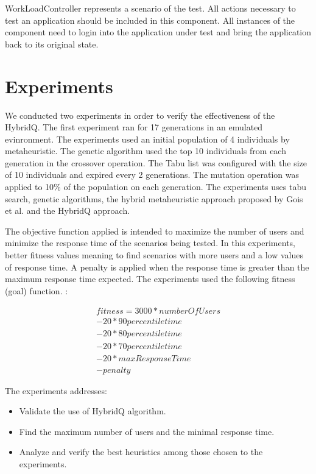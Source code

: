 WorkLoadController represents a scenario of the test. All actions necessary to test an application should be included in this component. All instances of the component need to login into the application under test and bring the application back to its original state.

\section{Experiments}

We conducted two experiments in order to verify the effectiveness of the HybridQ. The first experiment ran for 17 generations in an emulated evinronment. The experiments used an initial population of 4 individuals by metaheuristic. The genetic algorithm used the top 10 individuals from each generation in the crossover operation. The Tabu list was configured with the size of 10 individuals and expired every 2 generations.  The mutation operation was applied to 10\% of the population on each generation. The experiments uses tabu search, genetic algorithms, the hybrid metaheuristic approach proposed by Gois et al. \cite{Gois2016} and the HybridQ approach. 


The objective function applied is intended to maximize the number of users and minimize the response time of the scenarios being tested.  In this experiments, better fitness values meaning to find scenarios with more users and a low values of response time. A penalty is applied when the response time is greater than the  maximum response time expected. The experiments used the following fitness (goal) function. :

\begin{equation}
\begin{aligned}
fitness=3000*numberOfUsers\\
-20* 90percentiletime\\
-20*80percentiletime\\
-20*70percentiletime\\
-20*maxResponseTime\\
-penalty
\end{aligned}
\end{equation}

The experiments addresses:

\begin{itemize}
\item Validate the use of HybridQ algorithm.
\item Find the maximum number of users and the minimal response time.
\item Analyze and verify the best heuristics among those chosen to the experiments.
\end{itemize}


